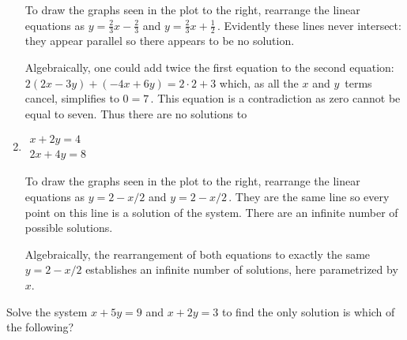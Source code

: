 \begin{example}
\begin{enumerate}[ref=\ref{eg:2eqs2vars}(\alph*)]
\begin{figbox}
\begin{solution} 
To draw the graphs seen in the plot to the right, rearrange  the linear equations as \(y=\frac23x-\frac23\) and \(y=\frac23x+\frac12\)\,.  
Evidently these lines never intersect: they appear parallel so there appears to be no solution.

Algebraically, one could add twice the first equation to the second equation: \(2(2x-3y)+(-4x+6y)=2\cdot2+3\) which, as all the \(x\) and \(y\)~terms cancel, simplifies to \(0=7\)\,. 
This equation is a contradiction as zero cannot be equal to seven.  
Thus there are no solutions to 

\end{solution}
\end{figbox}


\item 
\begin{figbox}{}
\(\begin{array}{l} x+2y=4\\2x+4y=8 \end{array}\)

\begin{solution} 
To draw the graphs seen in the plot to the right, rearrange  the linear equations as \(y=2-x/2\) and \(y=2-x/2\)\,.  
They are the same line so every point on this line is a solution of the system.  
There are an infinite number of possible solutions.

Algebraically, the rearrangement of both equations to exactly the same \(y=2-x/2\) establishes an infinite number of solutions, here parametrized by~\(x\).

\aqed
\end{solution}
\end{figbox}

\end{enumerate}
\end{example}



\begin{activity}
Solve the system \(x+5y=9\) and \(x+2y=3\) to find the only solution is which of the following?
\end{activity}




